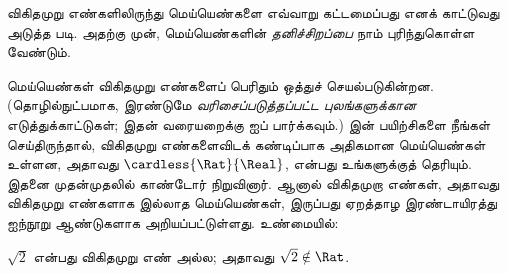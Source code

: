 \documentclass[../../../include/open-logic-section]{subfiles}
\begin{document}

விகிதமுறு எண்களிலிருந்து மெய்யெண்களை எவ்வாறு கட்டமைப்பது எனக்
காட்டுவது அடுத்த படி. அதற்கு முன், மெய்யெண்களின்
\emph{தனிச்சிறப்பை} நாம் புரிந்துகொள்ள வேண்டும்.

மெய்யெண்கள் விகிதமுறு எண்களைப் பெரிதும் ஒத்துச் செயல்படுகின்றன.
(தொழில்நுட்பமாக, இரண்டுமே \emph{வரிசைப்படுத்தப்பட்ட புலங்களுக்கான}
எடுத்துக்காட்டுகள்; இதன் வரையறைக்கு  ஐப்
பார்க்கவும்.)
 இன் பயிற்சிகளை நீங்கள் செய்திருந்தால்,
விகிதமுறு எண்களைவிடக் கண்டிப்பாக அதிகமான மெய்யெண்கள் உள்ளன,
அதாவது $\cardless{\Rat}{\Real}$, என்பது உங்களுக்குத் தெரியும்.
இதனை முதன்முதலில் காண்டோர் நிறுவினார்.
ஆனால் விகிதமுறா எண்கள், அதாவது விகிதமுறு எண்களாக இல்லாத மெய்யெண்கள்,
இருப்பது ஏறத்தாழ இரண்டாயிரத்து ஐந்நூறு ஆண்டுகளாக அறியப்பட்டுள்ளது.
உண்மையில்:

\begin{thm}
$\sqrt{2}$ என்பது விகிதமுறு எண் அல்ல;
அதாவது $\sqrt{2} \notin \Rat$.
\end{thm}
\end{document}
